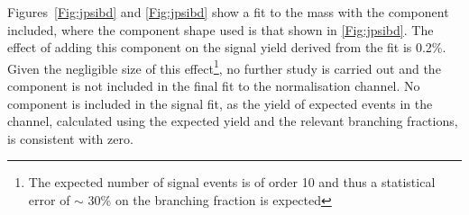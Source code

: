 Figures~\ref{Fig:jpsibd}\protect{} and \ref{Fig:jpsibd}\protect{} show a fit to the \Lbpijpsi mass with the \BdToJPsiKst component included, where the component shape used is that shown in \autoref{Fig:jpsibd}\protect{}. The effect of adding this \BdToJPsiKst component on the \Lbpijpsi signal yield derived from the fit is 0.2\%. Given the negligible size of this effect\footnote{The expected number of \Lbpi signal events is of order 10 and thus a statistical error of $\sim$ 30\%  on the branching fraction is expected}, no further study is carried out and the \BdToJPsiKst component is not included in the final fit to the normalisation channel. No \BdToKstmm component is included in the signal fit, as the yield of expected \BdToKstmm events in the \Lbpi channel, calculated using the expected \BdToJPsiKst yield and the relevant branching fractions, is consistent with zero. 







